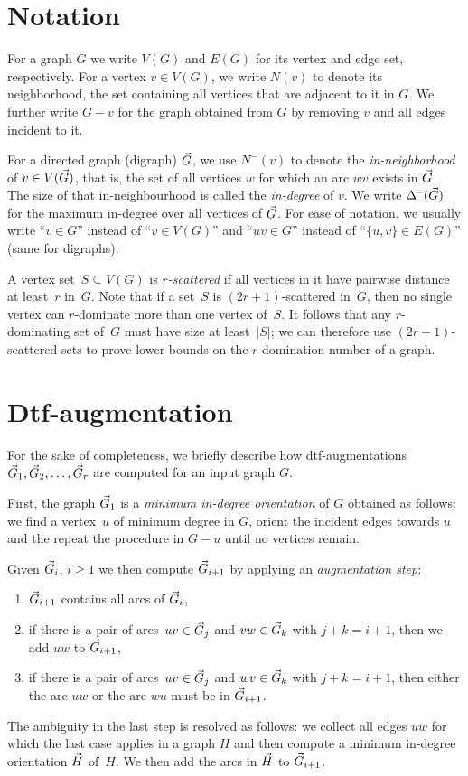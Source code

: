 \appendix

\section{Notation}\label{app:notation} For a graph $G$
we write $V(G)$ and $E(G)$ for its vertex and edge set, respectively. For a
vertex $v \in V(G)$, we write $N(v)$ to denote its neighborhood, \ie the set
containing all vertices that are adjacent to it in $G$. We further
write $G-v$ for the graph obtained from $G$ by removing $v$ and all edges
incident to it.

For a directed graph (digraph) $\vec{G}$, we use $N^-(v)$ to denote
the \emph{in-neighborhood} of $v \in V(\vec{G})$, that is, the set
of all vertices $w$ for which an arc $wv$ exists in $\vec{G}$. The
size of that in-neighbourhood is called the \emph{in-degree} of $v$.
We write $\Delta^{\!-}(\vec{G})$ for the maximum in-degree over all
vertices of $\vec{G}$.
For ease of notation, we usually write ``$v \in G$'' instead of
``$v \in V(G)$'' and ``$uv \in G$'' instead of ``$\{u,v\} \in E(G)$''
(same for digraphs).

A vertex set~$S \subseteq V(G)$ is \emph{$r$-scattered} if all vertices
in it have pairwise distance at least~$r$ in~$G$. Note that if a set~$S$
is $(2r+1)$-scattered in~$G$, then no single vertex can $r$-dominate
more than one vertex of~$S$. It follows that any $r$-dominating set of~$G$ must
have size at least~$|S|$; we can therefore use $(2r+1)$-scattered sets to
prove lower bounds on the $r$-domination number of a graph.

\section{Dtf-augmentation}\label{app:dtf} For the sake
of completeness, we briefly describe how dtf-augmentations
$\vec{G}_1, \vec{G}_2, \ldots, \vec{G}_r$ are computed for an input
graph $G$.

First, the graph $\vec{G}_1$ is a \emph{minimum in-degree
orientation} of $G$ obtained as follows: we find a vertex~$u$ of
minimum degree in $G$, orient the incident edges towards $u$ and
the repeat the procedure in $G - u$ until no vertices remain.

Given $\vec{G}_i$, $i \geq 1$ we then compute $\vec{G}_{i+1}$ by
applying an \emph{augmentation step}:

\begin{enumerate}
    \item $\vec{G}_{i+1}$ contains all arcs of $\vec{G}_i$,
    \item if there is a pair of arcs~$uv \in \vec{G}_j$
          and $vw \in \vec{G}_k$ with $j + k = i + 1$, then
          we add $uw$ to $\vec{G}_{i+1}$,
    \item if there is a pair of arcs~$uv \in \vec{G}_j$
          and $wv \in \vec{G}_k$ with $j + k = i + 1$, then
          either the arc $uw$ or the arc $wu$ must be
          in $\vec{G}_{i+1}$.
\end{enumerate}
The ambiguity in the last step is resolved as follows:
we collect all edges $uw$ for which the last case applies
in a graph $H$ and then compute a minimum in-degree
orientation $\vec{H}$ of~$H$. We then add the arcs
in $\vec{H}$ to $\vec{G}_{i+1}$.

